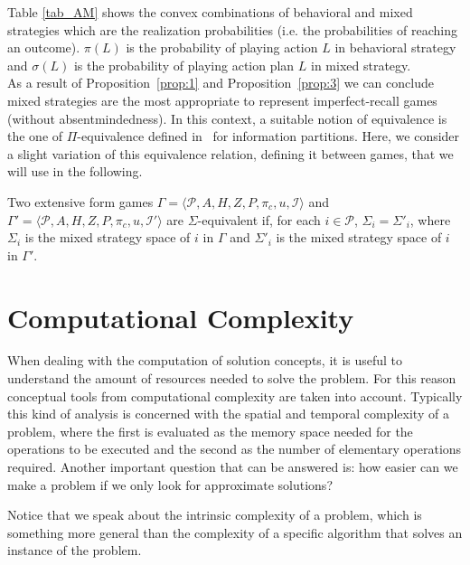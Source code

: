 \noindent
Table \ref{tab_AM} shows the convex combinations of behavioral and mixed strategies which are the realization probabilities (i.e. the probabilities of reaching an outcome). $\pi(L)$ is the probability of playing action $L$ in behavioral strategy and $\sigma(L)$ is the probability of playing action plan $L$ in mixed strategy. \\


\noindent
As a result of Proposition~\ref{prop:1} and Proposition~\ref{prop:3} we can conclude mixed strategies are the most appropriate to represent imperfect-recall games (without absentmindedness).
In this context, a suitable notion of equivalence is the one of $\Pi$-equivalence defined in~\citep{Kaneko1995} for information partitions. Here, we consider a slight variation of this equivalence relation, defining it between games, that we will use in the following.
\begin{definition}\label{sigma}
	Two extensive form games $\Gamma=\langle \mathcal{P},A,H,Z,P,\pi_c,u,\mathcal{I}\rangle$ and $\Gamma'=\langle \mathcal{P},A,H,Z,P,\pi_c,u,\mathcal{I}'\rangle$ are $\Sigma$-equivalent if, for each $i\in\mathcal{P}$, $\Sigma_i=\Sigma'_i$, where $\Sigma_i$ is the mixed strategy space of $i$ in $\Gamma$ and $\Sigma'_i$ is the mixed strategy space of $i$ in $\Gamma'$.
\end{definition}



\section{Computational Complexity}\label{sec:compl}
When dealing with the computation of solution concepts, it is useful to understand the amount of resources needed to solve the problem. For this reason conceptual tools from computational complexity are taken into account. Typically this kind of analysis is concerned with the spatial and temporal complexity of a problem, where the first is evaluated as the memory space needed for the operations to be executed and the second as the number of elementary operations required. Another important question that can be answered is: how easier can we make a problem if we only look for approximate solutions?

Notice that we speak about the intrinsic complexity of a problem, which is something more general than the complexity of a specific algorithm that solves an instance of the problem. 

